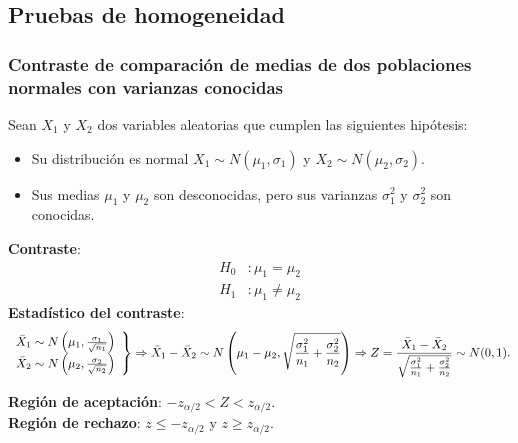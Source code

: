 \subsection{Pruebas de homogeneidad}
\begin{frame}
\frametitle{Contraste de comparación de medias de dos poblaciones normales con varianzas conocidas}
Sean $X_1$ y $X_2$ dos variables aleatorias que cumplen las siguientes hipótesis:
\begin{itemize}
\item Su distribución es normal $X_1\sim N(\mu_1,\sigma_1)$ y $X_2\sim N(\mu_2,\sigma_2)$.
\item Sus medias $\mu_1$ y $\mu_2$ son desconocidas, pero sus varianzas $\sigma^2_1$ y $\sigma^2_2$ son conocidas.
\end{itemize}
\textbf{Contraste}:
\begin{align*}
H_0 &: \mu_1=\mu_2\\
H_1 &: \mu_1\neq \mu_2
\end{align*}
\textbf{Estadístico del contraste}:
{%
\[
\left.
\begin{array}{l}
\bar{X}_1\sim N\left(\mu_1,\frac{\sigma_1}{\sqrt{n_1}} \right)\\
\bar{X}_2\sim N\left(\mu_2,\frac{\sigma_2}{\sqrt{n_2}} \right)
\end{array}
\right\}
\footnotesize
\Rightarrow
\bar{X}_1-\bar{X}_2 \sim N\left(\mu_1-\mu_2,\sqrt{\frac{\sigma^2_1}{n_1}+\frac{\sigma^2_2}{n_2}}\right)
\Rightarrow Z= \frac{\bar{X}_1-\bar{X}_2}{\sqrt{\frac{\sigma^2_1}{n_1}+\frac{\sigma^2_2}{n_2}}}\sim
N(0,1).
\]
}

\textbf{Región de aceptación}: $-z_{\alpha/2}< Z < z_{\alpha/2}$.\\
\textbf{Región de rechazo}: $z\leq -z_{\alpha/2}$ y $z\geq z_{\alpha/2}$.
\end{frame}


